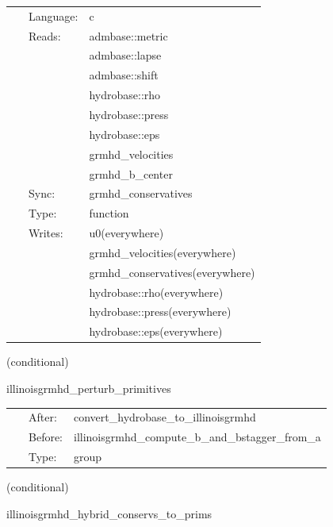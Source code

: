  \begin{tabular*}{160mm}{cll} 
~ & Language:  & c \\ 
~ & Reads:  & admbase::metric \\ 
~& ~ &admbase::lapse\\ 
~& ~ &admbase::shift\\ 
~& ~ &hydrobase::rho\\ 
~& ~ &hydrobase::press\\ 
~& ~ &hydrobase::eps\\ 
~& ~ &grmhd\_velocities\\ 
~& ~ &grmhd\_b\_center\\ 
~ & Sync:  & grmhd\_conservatives \\ 
~ & Type:  & function \\ 
~ & Writes:  & u0(everywhere) \\ 
~& ~ &grmhd\_velocities(everywhere)\\ 
~& ~ &grmhd\_conservatives(everywhere)\\ 
~& ~ &hydrobase::rho(everywhere)\\ 
~& ~ &hydrobase::press(everywhere)\\ 
~& ~ &hydrobase::eps(everywhere)\\ 
\end{tabular*} 


\vspace{5mm}

   (conditional) 

\hspace{5mm} illinoisgrmhd\_perturb\_primitives 

\hspace{5mm}{\it perturb initial primitive data } 


\hspace{5mm}

 \begin{tabular*}{160mm}{cll} 
~ & After:  & convert\_hydrobase\_to\_illinoisgrmhd \\ 
~ & Before:  & illinoisgrmhd\_compute\_b\_and\_bstagger\_from\_a \\ 
~ & Type:  & group \\ 
\end{tabular*} 


\vspace{5mm}

   (conditional) 

\hspace{5mm} illinoisgrmhd\_hybrid\_conservs\_to\_prims 

